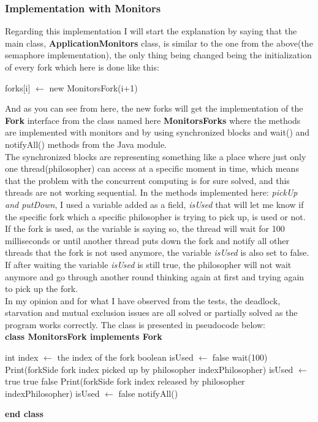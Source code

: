\documentclass[14pt]{article}
\begin{document}
\subsubsection{Implementation with Monitors}
Regarding this implementation I will start the explanation by saying that the main class, \textbf{ApplicationMonitors} class, is similar to the one from the above(the semaphore implementation), the only thing being changed being the initialization of every fork which here is done like this:
\begin{algorithmic}
        \State forks[i] $\gets$ new MonitorsFork(i+1)
    \EndFor
\end{algorithmic}
And as you can see from here, the new forks will get the implementation of the \textbf{Fork} interface from the class named here \textbf{MonitorsForks} where the methods are implemented with monitors and by using synchronized blocks and wait() and notifyAll() methods from the Java module.
\\The synchronized blocks are representing something like a place where just only one thread(philosopher) can access at a specific moment in time, which means that the problem with the concurrent computing is for sure solved, and this threads are not working sequential. In the methods implemented here: \textit{pickUp and putDown}, I used a variable added as a field, \textit{isUsed} that will let me know if the specific fork which a specific philosopher is trying to pick up, is used or not. If the fork is used, as the variable is saying so, the thread will wait for 100 milliseconds or until another thread puts down the fork and notify all other threads that the fork is not used anymore, the variable \textit{isUsed} is also set to false. If after waiting the variable \textit{isUsed} is still true, the philosopher will not wait anymore and go through another round thinking again at first and trying again to pick up the fork. 
\\In my opinion and for what I have observed from the tests, the deadlock, starvation and mutual exclusion issues are all solved or partially solved as the program works correctly. The class is presented in pseudocode below:
\vspace{2.5 mm}
\\\textbf{class MonitorsFork implements Fork}
\begin{algorithmic}
\State int index $\gets$ the index of the fork
\State boolean isUsed $\gets$ false
        \State wait(100)
    \EndIf
        \State Print(forkSide fork index picked up by philosopher indexPhilosopher)
        \State isUsed $\gets$ true
        \State \Return true
    \EndIf
    \State \Return false
\EndFunction
\vspace{1 mm}
    \State Print(forkSide fork index released by philosopher indexPhilosopher)
    \State isUsed $\gets$ false
    \State notifyAll()
\EndFunction
\end{algorithmic}
\textbf{end class}
\end{document}

